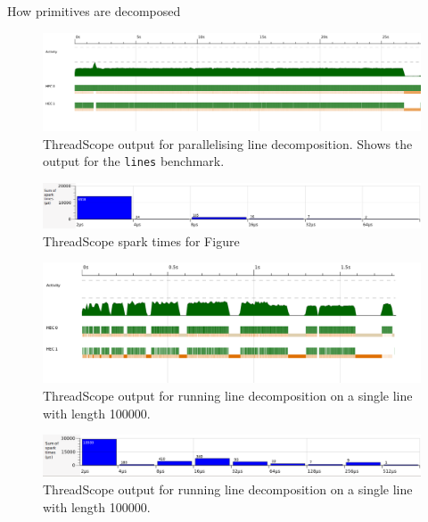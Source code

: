 \documentclass[12pt]{beamer}
\begin{document}
\begin{frame}
  How primitives are decomposed
\end{frame}


\begin{frame}
\begin{figure}[h!]
  \centering
  \includegraphics[width=0.85\linewidth]{../threadscope/lines/single-split}
  \caption{ThreadScope output for parallelising line decomposition. Shows the output for the
    \texttt{lines} benchmark.}
  \label{fig:line-thread}
\end{figure}

\begin{figure}[h!]
  \centering
  \includegraphics[width=0.85\linewidth]{../threadscope/lines/single-split-spark-times}
  \caption{ThreadScope spark times for Figure }
  \label{fig:line-thread-sparks}
\end{figure}
\end{frame}


\begin{frame}
\begin{figure}[h!]
  \centering
  \includegraphics[width=0.85\linewidth]{../threadscope/lines/single-line-every-10}
  \caption{ThreadScope output for running line decomposition on a single line with length
    100000.}
  \label{fig:single-line-thread}
\end{figure}

\begin{figure}[h!]
  \centering
  \includegraphics[width=0.85\linewidth]{../threadscope/lines/single-line-every-10-spark-times}
  \caption{ThreadScope output for running line decomposition on a single line with length
    100000.}
  \label{fig:single-line-thread-sparks}
\end{figure}
\end{frame}
\end{document}
